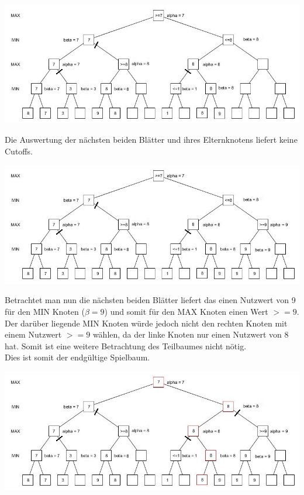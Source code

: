  \begin{center}
 	\includegraphics[width = 12 cm]{chapters/minimax/jpg/Alpha-beta8.jpg}
 \end{center}

 Die Auswertung der nächsten beiden Blätter und ihres Elternknotens liefert keine Cutoffs.

 \begin{center}
 	\includegraphics[width = 12 cm]{chapters/minimax/jpg/Alpha-beta9.jpg}
 \end{center}

 Betrachtet man nun die nächsten beiden Blätter liefert das einen Nutzwert von 9 für den MIN Knoten ($\beta =9$) und somit für den MAX Knoten einen Wert $>=9$. Der darüber liegende MIN Knoten würde jedoch nicht den rechten Knoten mit einem Nutzwert $>=9$ wählen, da der linke Knoten nur einen Nutzwert von 8 hat. Somit ist eine weitere Betrachtung des Teilbaumes nicht nötig.\\
 Dies ist somit der endgültige Spielbaum.

 \begin{center}
 	\includegraphics[width = 12 cm]{chapters/minimax/jpg/Alpha-beta10.jpg}
 \end{center}

